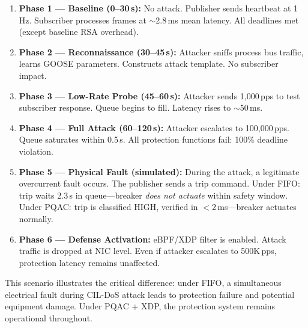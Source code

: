 \documentclass{ieeeaccess}
\begin{document}
\begin{enumerate}[leftmargin=*]
    \item \textbf{Phase 1 --- Baseline (0--30\,s):} No attack. Publisher sends heartbeat at 1\,Hz. Subscriber processes frames at $\sim$2.8\,ms mean latency. All deadlines met (except baseline RSA overhead).
    
    \item \textbf{Phase 2 --- Reconnaissance (30--45\,s):} Attacker sniffs process bus traffic, learns GOOSE parameters. Constructs attack template. No subscriber impact.
    
    \item \textbf{Phase 3 --- Low-Rate Probe (45--60\,s):} Attacker sends 1,000\,pps to test subscriber response. Queue begins to fill. Latency rises to $\sim$50\,ms.
    
    \item \textbf{Phase 4 --- Full Attack (60--120\,s):} Attacker escalates to 100,000\,pps. Queue saturates within 0.5\,s. All protection functions fail: 100\% deadline violation.
    
    \item \textbf{Phase 5 --- Physical Fault (simulated):} During the attack, a legitimate overcurrent fault occurs. The publisher sends a trip command. Under FIFO: trip waits 2.3\,s in queue---breaker \emph{does not actuate} within safety window. Under PQAC: trip is classified HIGH, verified in $<$2\,ms---breaker actuates normally.
    
    \item \textbf{Phase 6 --- Defense Activation:} eBPF/XDP filter is enabled. Attack traffic is dropped at NIC level. Even if attacker escalates to 500K\,pps, protection latency remains unaffected.
\end{enumerate}

This scenario illustrates the critical difference: under FIFO, a simultaneous electrical fault during CIL-DoS attack leads to protection failure and potential equipment damage. Under PQAC + XDP, the protection system remains operational throughout.
\end{document}
